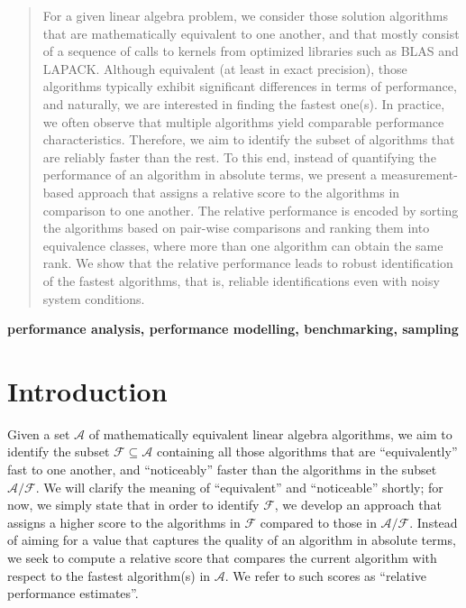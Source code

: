 \documentclass[conference]{IEEEtran}
\begin{document}
\begin{abstract}

  For a given linear algebra problem, we consider those solution algorithms that are mathematically equivalent to one
  another, and that mostly consist of a sequence of calls to kernels from optimized libraries such as BLAS and
  LAPACK. Although equivalent (at least in exact precision), those algorithms typically exhibit significant differences
  in terms of performance, and naturally, we are interested in finding the fastest one(s). In practice, we often observe
  that multiple algorithms yield comparable performance characteristics. Therefore, we aim to identify the subset of algorithms that are reliably faster than the rest. To this end, instead of quantifying the performance of an
  algorithm in absolute terms, we present a measurement-based approach that assigns a relative score to the algorithms
  in comparison to one another. The relative performance is encoded by sorting the algorithms based on pair-wise
  comparisons and ranking them into equivalence classes, where more than one algorithm can obtain the same rank. We show
  that the relative performance leads to robust identification of the fastest algorithms, that is, reliable identifications even with noisy system
  conditions.
\end{abstract}

\begin{IEEEkeywords}
\textbf{performance analysis, performance modelling, benchmarking, sampling}
\end{IEEEkeywords}


\section{Introduction}


Given a set $\mathcal{A}$ of mathematically equivalent linear algebra algorithms, we aim to identify the subset
$\mathcal{F} \subseteq \mathcal{A}$ containing all those algorithms that are ``equivalently'' fast to one another, and
``noticeably'' faster than the algorithms in the subset $\mathcal{A}/\mathcal{F}$. We will clarify the meaning of ``equivalent'' and
``noticeable'' shortly; for now, we simply state that in order to identify $\mathcal{F}$, 
we develop an approach that assigns a higher score to the algorithms in
$\mathcal{F}$ compared to those in $\mathcal{A}/\mathcal{F}$. Instead of aiming for a value that captures the quality of an algorithm in absolute terms, we seek to compute a relative score that compares the current algorithm with respect to the fastest algorithm(s) in $\mathcal{A}$. We refer to such scores as ``relative performance estimates''.
\end{document}
